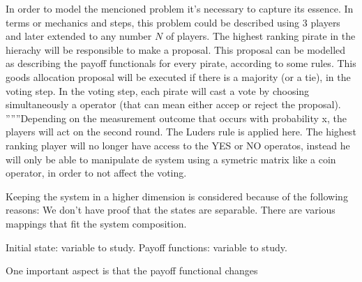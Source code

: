 In order to model the mencioned problem it's necessary to capture its essence.
In terms or mechanics and steps, this problem could be described using 3 players and later extended to any number $N$ of players. The highest ranking pirate in the hierachy will be responsible to make a proposal. This proposal can be modelled as describing the payoff functionals for every pirate, according to some rules. This goods allocation proposal will be executed if there is a majority (or a tie), in the voting step. In the voting step, each pirate will cast a vote by choosing simultaneously a operator (that can mean either accep or reject the proposal).
''''''Depending on the measurement outcome that occurs with probability x, the players will act on the second round. The Luders rule is applied here. The highest ranking player will no longer have access to the YES or NO operatos, instead he will only be able to manipulate de system using a symetric matrix like a coin operator, in order to not affect the voting.

Keeping the system in a higher dimension is considered because of the following reasons: We don't have proof that the states are separable. There are various mappings that fit the system composition. 


Initial state: variable to study.
Payoff functions: variable to study.

\begin{emph}
One important aspect is that the payoff functional changes
\end{emph}